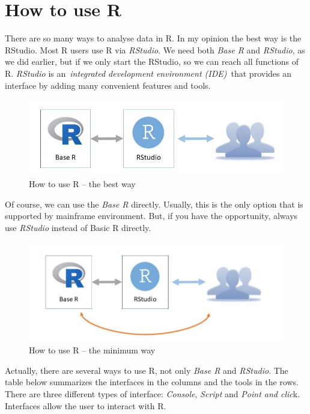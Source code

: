 \documentclass[
]{book}
\begin{document}
\hypertarget{how-to-use-r}{%
\chapter{How to use R}\label{how-to-use-r}}

There are so many ways to analyse data in R. In my opinion the best way
is the RStudio. Most R users use R via \emph{RStudio}. We need both \emph{Base R}
and \emph{RStudio}, as we did earlier, but if we only start the RStudio, so
we can reach all functions of R. \emph{RStudio} is an~\emph{integrated development
environment (IDE)}~that provides an interface by adding many convenient
features and tools.

\begin{figure}

{\centering \includegraphics[width=0.6\linewidth]{img/baser_rstudio} 

}

\caption{How to use R – the best way}\label{fig:unnamed-chunk-2}
\end{figure}

Of course, we can use the \emph{Base R} directly. Usually, this is the only
option that is supported by mainframe environment. But, if you have the
opportunity, always use \emph{RStudio} instead of Basic R directly.

\begin{figure}

{\centering \includegraphics[width=0.6\linewidth]{img/baser_rstudio_min} 

}

\caption{How to use R – the minimum way}\label{fig:unnamed-chunk-3}
\end{figure}

Actually, there are several ways to use R, not only \emph{Base R} and
\emph{RStudio}. The table below summarizes the interfaces in the columns and
the tools in the rows. There are three different types of interface:
\emph{Console}, \emph{Script} and \emph{Point and clic}k. Interfaces allow the user to
interact with R.~
\end{document}

